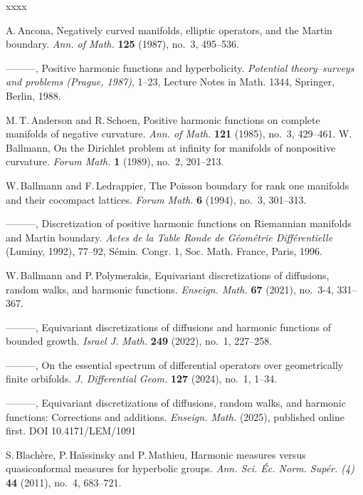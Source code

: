 \documentclass[12pt,a4paper]{amsart}
\numberwithin{equation}{section}
\theoremstyle{definition}
\begin{document}
\newpage
\begin{thebibliography}{xxxx}

 A.\,Ancona,
 Negatively curved manifolds, elliptic operators, and the Martin boundary.
 \emph{Ann. of Math.} {\bf 125} (1987), no.~3, 495--536.
 
---{}---{}---,
Positive harmonic functions and hyperbolicity.
\emph{Potential theory--surveys and problems (Prague, 1987)}, 1--23, Lecture Notes in Math. 1344, Springer, Berlin, 1988.

M.\,T.\,Anderson and R.\,Schoen,
Positive harmonic functions on complete manifolds of negative curvature.
\emph{Ann. of Math.} {\bf 121} (1985), no.~3, 429--461. 
W.\,Ballmann,
On the {D}irichlet problem at infinity for manifolds of nonpositive curvature.
\emph{Forum Math.} {\bf 1} (1989), no.~2, 201--213.

W.\,Ballmann and F.\,Ledrappier,
The {P}oisson boundary for rank one manifolds and their cocompact lattices.
\emph{Forum Math.} {\bf 6} (1994), no.~3, 301--313.

---{}---{}---,
Discretization of positive harmonic functions on Riemannian manifolds and Martin boundary.
\emph{Actes de la Table Ronde de G\'eom\'etrie Diff\'erentielle} (Luminy, 1992), 77--92,
S\'emin. Congr. 1, Soc. Math. France, Paris, 1996. 

W.\,Ballmann and P.\,Polymerakis,
Equivariant discretizations of diffusions, random walks, and harmonic functions.
\emph{Enseign. Math.} {\bf 67} (2021), no.~3-4, 331--367.

---{}---{}---,
Equivariant discretizations of diffusions and harmonic functions of bounded growth.
\emph{Israel J. Math.} {\bf 249} (2022), no.~1, 227--258. 

---{}---{}---,
On the essential spectrum of differential operators over geometrically finite orbifolds.
\emph {J. Differential Geom.} {\bf 127} (2024), no.~1, 1--34.
 
---{}---{}---,
Equivariant discretizations of diffusions, random walks, and harmonic functions: Corrections and additions.
\emph{Enseign. Math.} (2025), published online first.
DOI 10.4171/LEM/1091

S.\,Blach\`ere, P.\,Ha\"issinsky and P.\,Mathieu,
Harmonic measures versus quasiconformal measures for hyperbolic groups.
\emph{Ann. Sci. \'Ec. Norm. Sup\'er. (4)} {\bf 44} (2011), no.~4, 683--721.


\end{thebibliography}
\end{document}
